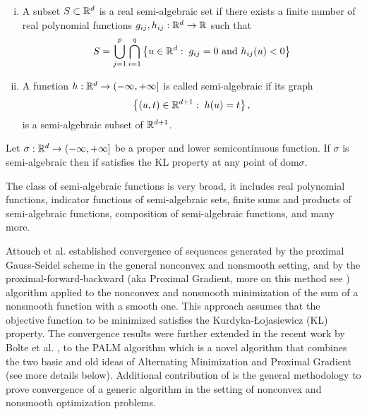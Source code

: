 \begin{definition} 
\begin{enumerate}[(i)]
	\item A subset $S \subset \mathbb{R}^d$ is a real semi-algebraic set if there exists a finite number of real polynomial functions $g_{ij}, h_{ij}: \mathbb{R}^d \rightarrow \mathbb{R}$ such that
	\begin{equation*}
		S = \bigcup\limits_{j=1}^{p} \bigcap\limits_{i=1}^{q} \left\lbrace u \in \mathbb{R}^d : \; g_{ij}=0 \text{ and } h_{ij}(u)<0 \right\rbrace
	\end{equation*}
	\item A function $h:\mathbb{R}^d \rightarrow (-\infty, +\infty]$ is called semi-algebraic if its graph
	\begin{equation*}
		\left\lbrace (u,t)\in\mathbb{R}^{d+1} : \; h(u)=t \right\rbrace ,
	\end{equation*}
	is a semi-algebraic subset of $\mathbb{R}^{d+1}$.
\end{enumerate}
\end{definition}

\begin{theorem} \label{SA_is_KL}
Let $\sigma:\mathbb{R}^d \rightarrow (-\infty, +\infty]$ be a proper and lower semicontinuous function. If $\sigma$ is semi-algebraic then if satisfies the KL property at any point of dom$\sigma$.
\end{theorem}
The class of semi-algebraic functions is very broad, it includes real polynomial functions, indicator functions of semi-algebraic sets, finite sums and products of semi-algebraic functions, composition of semi-algebraic functions, and many more.\medskip

Attouch et al. \cite{AB2009, ABS2013} established convergence of sequences generated by the proximal Gauss-Seidel scheme in the general nonconvex and nonsmooth setting, and by the proximal-forward-backward (aka Proximal Gradient, more on this method see \cite{LM1979,T1991,CR1997}) algorithm applied to the nonconvex and nonsmooth minimization of the sum of a nonsmooth function with a smooth one. This approach assumes that the objective function to be minimized satisfies the Kurdyka-{\L}ojasiewicz (KL) property. The convergence results were further extended in the recent work by Bolte et al. \cite{BST2014}, to the PALM algorithm which is a novel algorithm that combines the two basic and old ideas of Alternating Minimization and Proximal Gradient (see more details below). Additional contribution of \cite{BST2014} is the general methodology to prove convergence of a generic algorithm in the setting of nonconvex and nonsmooth optimization problems.\medskip

